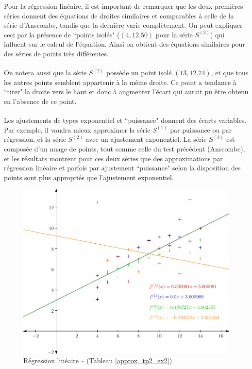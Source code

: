 \documentclass{report}
\begin{document}
	Pour la régression linéaire, il est important de remarquer que les deux premières séries donnent des équations de droites similaires et comparables à celle de la série d'Anscombe, tandis que la dernière varie complètement. On peut expliquer ceci par la présence de ``points isolés" ($(4,12.50)$ pour la série $S^{(3)}$) qui influent sur le calcul de l'équation. Ainsi on obtient des équations similaires pour des séries de points très différentes.\\ \\
	
	On notera aussi que la série $S^{(2)}$ possède un point isolé $(13,12.74)$, et que tous les autres points semblent appartenir à la même droite. Ce point a tendance à ``tirer" la droite vers le haut et donc à augmenter l'écart qui aurait pu être obtenu en l'absence de ce point.\\ \\
	
	Les ajustements de types exponentiel et ``puissance" donnent des écarts variables. Par exemple, il vaudra mieux approximer la série $S^{(1)}$ par puissance ou par régression, et la série $S^{(2)}$ avec un ajustement exponentiel. La série $S^{(3)}$ est composée d'un nuage de points, tout comme celle du test précédent (Anscombe), et les résultats montrent pour ces deux séries que des approximations par régression linéaire et parfois par ajustement ``puissance" selon la disposition des points sont plus appropriés que l'ajustement exponentiel.
	
	\newpage
	\begin{figure}[h!]
	  \centering
	  \includegraphics[scale=0.75]{graphiques/pdf_output/reglin_tp2_ex2_1.pdf}
	  \caption{Régression linéaire -- (Tableau \ref{approx_tp2_ex2})}
	\end{figure}
\end{document}
